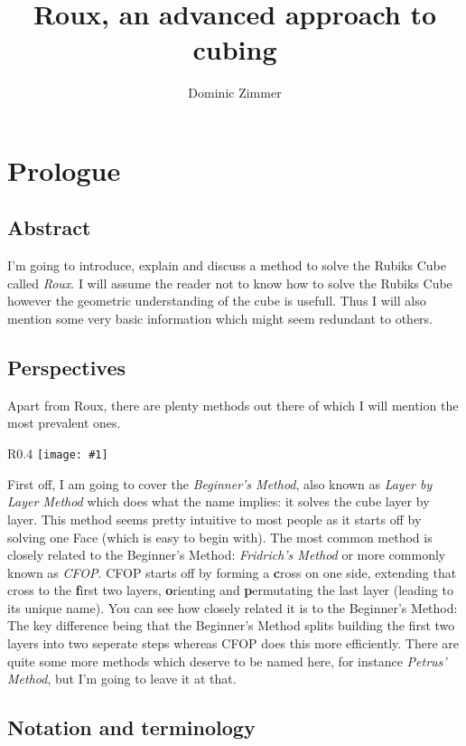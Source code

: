 \documentclass{scrreprt}
\newcommand{\wrapfig}[5] {
	\begin{wrapfigure}{#2}{#3\textwidth}
	\centering
	\texttt{[image: \#1]}
	\caption*{#5}
	\end{wrapfigure}
}
\begin{document}
\title{Roux, an advanced approach to cubing}
\author{Dominic Zimmer}
\maketitle 

\tableofcontents
\chapter{Prologue}

\section{Abstract}
I'm going to introduce, explain and discuss a method to solve the Rubiks Cube called \emph{Roux}. I will assume the reader not to know how to solve the Rubiks Cube however the geometric understanding of the cube is usefull. Thus I will also mention some very basic information which might seem redundant to others.

\section{Perspectives}
Apart from Roux, there are plenty methods out there of which I will mention the most prevalent ones.

\wrapfig{union.png}{R}{0.4}{0.3}{The four steps of using the Beginners Method}

First off, I am going to cover the \emph{Beginner's Method}, also known as \emph{Layer by Layer Method} which does what the name implies: it solves the cube layer by layer. This method seems pretty intuitive to most people as it starts off by solving one Face (which is easy to begin with). The most common method is closely related to the Beginner's Method: \emph{Fridrich's Method} or more commonly known as \emph{CFOP}. CFOP starts off by forming a \textbf{c}ross on one side, extending that cross to the \textbf{f}irst two layers, \textbf{o}rienting and \textbf{p}ermutating the last layer (leading to its unique name). You can see how closely related it is to the Beginner's Method: The key difference being that the Beginner's Method splits building the first two layers into two seperate steps whereas CFOP does this more efficiently. There are quite some more methods which deserve to be named here, for instance \emph{Petrus' Method}, but I'm going to leave it at that.


\section{Notation and terminology}
\end{document}

